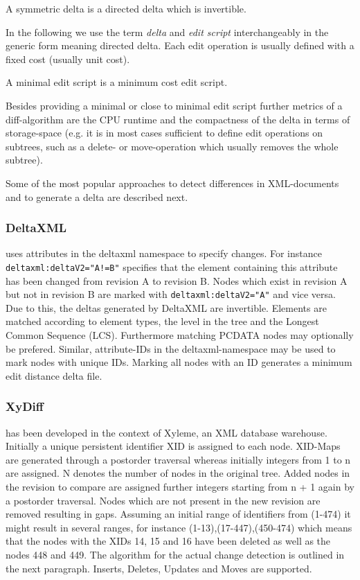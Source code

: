 \begin{mydef}
A symmetric delta is a directed delta which is invertible.
\end{mydef}

In the following we use the term \emph{delta} and \emph{edit script} interchangeably in the generic form meaning directed delta. Each edit operation is usually defined with a fixed cost (usually unit cost).

\begin{mydef}
A minimal edit script is a minimum cost edit script.
\end{mydef}

Besides providing a minimal or close to minimal edit script further metrics of a diff-algorithm are the CPU runtime and the compactness of the delta in terms of storage-space (e.g. it is in most cases sufficient to define edit operations on subtrees, such as a delete- or move-operation which usually removes the whole subtree).

Some of the most popular approaches to detect differences in XML-documents and to generate a delta are described next.

\subsubsection{DeltaXML\cite{DELTAXML}}
uses attributes in the deltaxml namespace to specify changes. For instance \texttt{deltaxml:deltaV2="A!=B"} specifies that the element containing this attribute has been changed from revision A to revision B. Nodes which exist in revision A but not in revision B are marked with \texttt{deltaxml:deltaV2="A"} and vice versa. Due to this, the deltas generated by DeltaXML are invertible. Elements are matched according to element types, the level in the tree and the Longest Common Sequence (LCS). Furthermore matching PCDATA nodes may optionally be prefered. Similar, attribute-IDs in the deltaxml-namespace may be used to mark nodes with unique IDs. Marking all nodes with an ID generates a minimum edit distance delta file.

\subsubsection{XyDiff\cite{cobena2002detecting}}
has been developed in the context of Xyleme, an XML database warehouse. Initially a unique persistent identifier XID is assigned to each node. XID-Maps are generated through a postorder traversal whereas initially integers from 1 to n are assigned. N denotes the number of nodes in the original tree. Added nodes in the revision to compare are assigned further integers starting from n + 1 again by a postorder traversal. Nodes which are not present in the new revision are removed resulting in gaps. Assuming an initial range of identifiers from (1-474) it might result in several ranges, for instance (1-13),(17-447),(450-474) which means that the nodes with the XIDs 14, 15 and 16 have been deleted as well as the nodes 448 and 449. The algorithm for the actual change detection is outlined in the next paragraph. Inserts, Deletes, Updates and Moves are supported.


